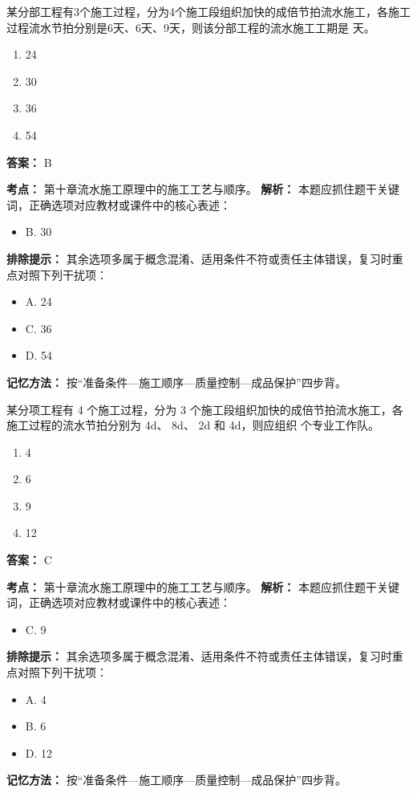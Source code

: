 \documentclass[UTF8,fontset=fandol,11pt]{ctexart}
\begin{document}
\begin{quizbox}[title={第 13 题}]
某分部工程有3个施工过程，分为4个施工段组织加快的成倍节拍流水施工，各施工过程流水节拍分别是6天、6天、9天，则该分部工程的流水施工工期是 天。\\
\begin{enumerate}[label=\Alph*.]
\item 24
\item 30
\item 36
\item 54
\end{enumerate}
\textbf{答案：} B
\vspace{0.25em}
\begin{answerbox}[title={考点解析}]
\textbf{考点：} 第十章流水施工原理中的施工工艺与顺序。
\textbf{解析：} 本题应抓住题干关键词，正确选项对应教材或课件中的核心表述：
\begin{itemize}
\item B. 30
\end{itemize}
\textbf{排除提示：} 其余选项多属于概念混淆、适用条件不符或责任主体错误，复习时重点对照下列干扰项：
\begin{itemize}
\item A. 24
\item C. 36
\item D. 54
\end{itemize}
\textbf{记忆方法：} 按“准备条件—施工顺序—质量控制—成品保护”四步背。
\end{answerbox}
\end{quizbox}

\begin{quizbox}[title={第 14 题}]
某分项工程有 4 个施工过程，分为 3 个施工段组织加快的成倍节拍流水施工，各施工过程的流水节拍分别为 4d、 8d、 2d 和 4d，则应组织 个专业工作队。\\
\begin{enumerate}[label=\Alph*.]
\item 4
\item 6
\item 9
\item 12
\end{enumerate}
\textbf{答案：} C
\vspace{0.25em}
\begin{answerbox}[title={考点解析}]
\textbf{考点：} 第十章流水施工原理中的施工工艺与顺序。
\textbf{解析：} 本题应抓住题干关键词，正确选项对应教材或课件中的核心表述：
\begin{itemize}
\item C. 9
\end{itemize}
\textbf{排除提示：} 其余选项多属于概念混淆、适用条件不符或责任主体错误，复习时重点对照下列干扰项：
\begin{itemize}
\item A. 4
\item B. 6
\item D. 12
\end{itemize}
\textbf{记忆方法：} 按“准备条件—施工顺序—质量控制—成品保护”四步背。
\end{answerbox}
\end{quizbox}
\end{document}
